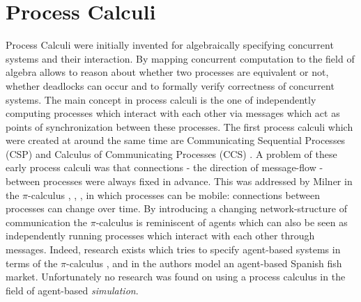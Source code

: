 \section{Process Calculi}
Process Calculi were initially invented for algebraically specifying concurrent systems and their interaction. By mapping concurrent computation to the field of algebra allows to reason about whether two processes are equivalent or not, whether deadlocks can occur and to formally verify correctness of concurrent systems. The main concept in process calculi is the one of independently computing processes which interact with each other via messages which act as points of synchronization between these processes. The first process calculi which were created at around the same time are Communicating Sequential Processes (CSP) \cite{hoare_communicating_1985} and Calculus of Communicating Processes (CCS) \cite{milner_calculus_1980}. A problem of these early process calculi was that connections - the direction of message-flow - between processes were always fixed in advance. This was addressed by Milner in the $\pi$-calculus \cite{milner_calculus_1992}, \cite{milner_calculus_1992-1}, \cite{milner_elements_1993}, \cite{milner_communicating_1999} in which processes can be mobile: connections between processes can change over time. 
By introducing a changing network-structure of communication the $\pi$-calculus is reminiscent of agents which can also be seen as independently running processes which interact with each other through messages. Indeed, research exists which tries to specify agent-based systems in terms of the $\pi$-calculus \cite{esterline_using_2001}, \cite{kawabe_nepi2programming_2000} and in \cite{padget_pi-calculus_1998} the authors model an agent-based Spanish fish market. Unfortunately no research was found on using a process calculus in the field of agent-based \textit{simulation}.